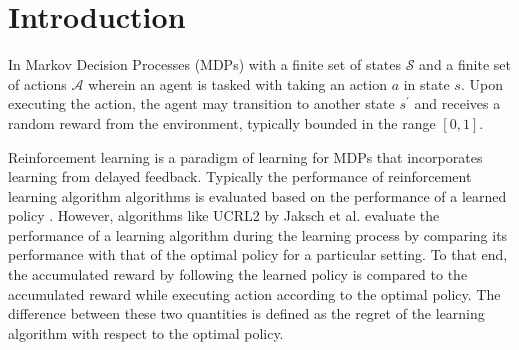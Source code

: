 \normallinespacing

\chapter{Introduction}

In Markov Decision Processes (MDPs) with a finite set of states $\mathcal{S}$ and a finite set of actions $\mathcal{A}$ wherein an agent is tasked with taking an action $a$ in state $s$.
Upon executing the action, the agent may transition to another state $s^\prime$ and receives a random reward from the environment, typically bounded in the range $[0, 1]$.

Reinforcement learning is a paradigm of learning for MDPs that incorporates learning from delayed feedback.
Typically the performance of reinforcement learning algorithm algorithms is evaluated based on the performance of a learned policy \cite{sutton_reinforcement_2018, kearns_finite-sample_1999}.
However, algorithms like UCRL2 \cite{jaksch_near-optimal_2010} by Jaksch et al. evaluate the performance of a learning algorithm during the learning process by comparing its performance with that of the optimal policy for a particular setting.
To that end, the accumulated reward by following the learned policy is compared to the accumulated reward while executing action according to the optimal policy.
The difference between these two quantities is defined as the regret of the learning algorithm with respect to the optimal policy.

